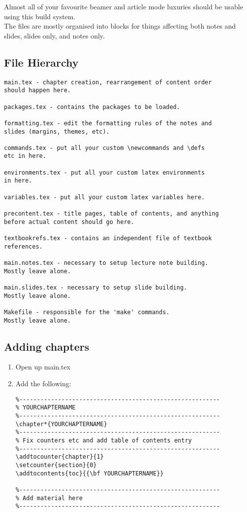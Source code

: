 \documentclass{article}
\begin{document}
Almost all of your favourite beamer and article mode luxuries should be usable
using this build system.\\

The files are mostly organised into blocks for things affecting both notes and
slides, slides only, and notes only.\\

\subsection{File Hierarchy}
\begin{verbatim}
main.tex - chapter creation, rearrangement of content order
should happen here.

packages.tex - contains the packages to be loaded.

formatting.tex - edit the formatting rules of the notes and
slides (margins, themes, etc).

commands.tex - put all your custom \newcommands and \defs
etc in here.

environments.tex - put all your custom latex environments
in here.

variables.tex - put all your custom latex variables here.

precontent.tex - title pages, table of contents, and anything
before actual content should go here.

textbookrefs.tex - contains an independent file of textbook
references.

main.notes.tex - necessary to setup lecture note building.
Mostly leave alone.

main.slides.tex - necessary to setup slide building.
Mostly leave alone.

Makefile - responsible for the 'make' commands.
Mostly leave alone.
\end{verbatim}

\subsection{Adding chapters}
\begin{enumerate}
\item Open up main.tex

\item Add the following:
\begin{verbatim}
%---------------------------------------------------------
% YOURCHAPTERNAME
%---------------------------------------------------------
\chapter*{YOURCHAPTERNAME}
%---------------------------------------------------------
% Fix counters etc and add table of contents entry
%---------------------------------------------------------
\addtocounter{chapter}{1}
\setcounter{section}{0}
\addtocontents{toc}{{\bf YOURCHAPTERNAME}}

%---------------------------------------------------------
% Add material here
%---------------------------------------------------------
\end{verbatim}
\end{enumerate}
\end{document}
